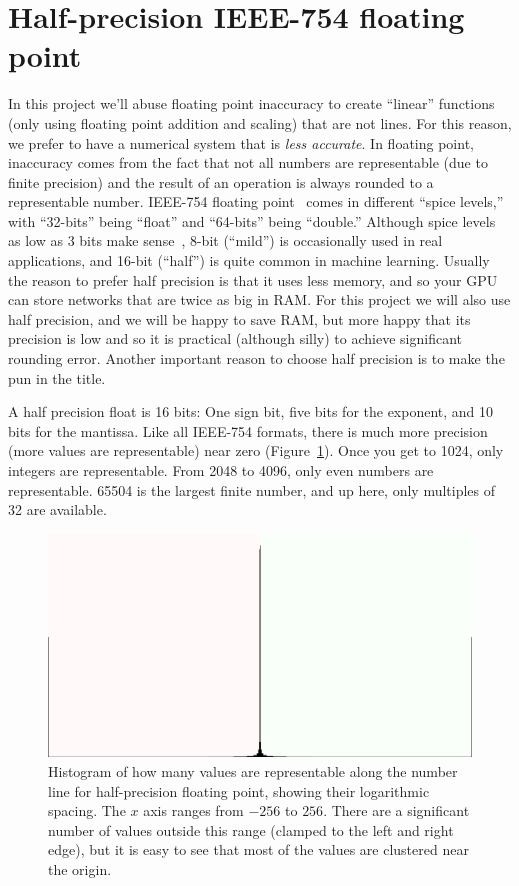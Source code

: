 \documentclass[twocolumn]{article}
\begin{document}
\section{Half-precision IEEE-754 floating point}
In this project we'll abuse floating point inaccuracy to create
``linear'' functions (only using floating point addition and scaling)
that are not lines. For this reason, we prefer to have a numerical
system that is {\em less accurate}. In floating point, inaccuracy comes
from the fact that not all numbers are representable (due to finite
precision) and the result of an operation is always rounded to a
representable number. IEEE-754 floating point~\cite{ieee754} comes in different
``spice levels,'' with ``32-bits'' being ``float'' and ``64-bits''
being ``double.'' Although spice levels as low as 3 bits make
sense~\cite{murphy2019nan}, 8-bit (``mild'') is occasionally used in
real applications, and 16-bit (``half'') is quite common in machine
learning. Usually the reason to prefer half precision is that it uses
less memory, and so your GPU can store networks that are twice as big
in RAM. For this project we will also use half precision, and we will
be happy to save RAM, but more happy that its precision is low and so
it is practical (although silly) to achieve significant rounding
error. Another important reason to choose half precision is to make
the pun in the title.

A half precision float is 16 bits: One sign bit, five bits for the
exponent, and 10 bits for the mantissa. Like all IEEE-754 formats,
there is much more precision (more values are representable) near
zero (Figure~\ref{fig:histogram}). Once you get to 1024,
only integers are representable. From 2048 to 4096, only even numbers
are representable. 65504 is the largest finite number, and up here,
only multiples of 32 are available.

\begin{figure}
  \begin{center}
    \includegraphics[width=0.65 \linewidth]{histo}
  \end{center}
\caption{
  Histogram of how many values are representable along the
  number line for half-precision floating point, showing
  their logarithmic spacing. The $x$ axis
  ranges from $-256$ to $256$. There are a significant number of
  values outside this range (clamped to the left and right
  edge), but it is easy to see that most of the values are
  clustered near the origin.
  } \label{fig:histogram}
\end{figure}
\end{document}
